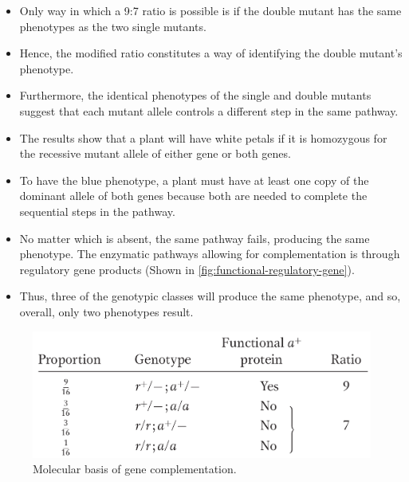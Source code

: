 \documentclass[11pt,dvipsnames,ignorenonframetext,aspectratio=169]{beamer}
\providecommand{\tightlist}{%
  \setlength{\itemsep}{0pt}\setlength{\parskip}{0pt}}
\begin{document}
\begin{frame}{}
\protect\hypertarget{section-16}{}

\begin{itemize}
\tightlist
\item
  Only way in which a 9:7 ratio is possible is if the double mutant has
  the same phenotypes as the two single mutants.
\item
  Hence, the modified ratio constitutes a way of identifying the double
  mutant's phenotype.
\item
  Furthermore, the identical phenotypes of the single and double mutants
  suggest that each mutant allele controls a different step in the same
  pathway.
\item
  The results show that a plant will have white petals if it is
  homozygous for the recessive mutant allele of either gene or both
  genes.
\item
  To have the blue phenotype, a plant must have at least one copy of the
  dominant allele of both genes because both are needed to complete the
  sequential steps in the pathway.
\item
  No matter which is absent, the same pathway fails, producing the same
  phenotype. The enzymatic pathways allowing for complementation is
  through regulatory gene products (Shown in
  \ref{fig:functional-regulatory-gene}).
\item
  Thus, three of the genotypic classes will produce the same phenotype,
  and so, overall, only two phenotypes result.
\end{itemize}

\end{frame}

\begin{frame}{}
\protect\hypertarget{section-17}{}

\begin{figure}

{\centering \includegraphics[width=0.4\linewidth]{./../images/gene_same_pathway2} 

}

\caption{Molecular basis of gene complementation.}\label{fig:gene-in-same-pathway2}
\end{figure}

\end{frame}
\end{document}

